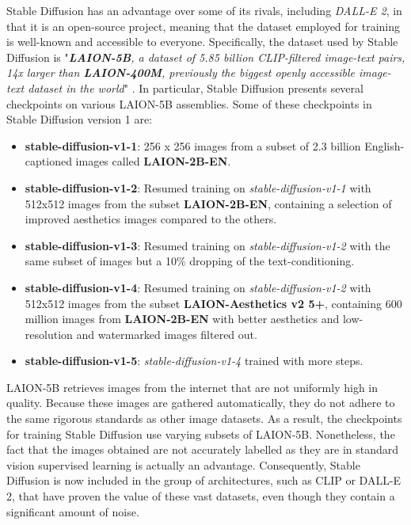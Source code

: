 Stable Diffusion has an advantage over some of its rivals, including \textit{DALL-E 2}, in that it is an open-source project, meaning that the dataset employed for training is well-known and accessible to everyone. Specifically, the dataset used by Stable Diffusion is "\textit{\textbf{LAION-5B}, a dataset of 5.85 billion CLIP-filtered image-text pairs, 14x larger than \textbf{LAION-400M}, previously the biggest openly accessible image-text dataset in the world}" \cite{schuhmann2022laion}. In particular, Stable Diffusion presents several checkpoints on various LAION-5B assemblies. Some of these checkpoints in Stable Diffusion version 1 \cite{SDCardHF} are:

\begin{itemize}
  \item \textbf{stable-diffusion-v1-1}: 256 x 256 images from a subset of 2.3 billion English-captioned images called \textbf{LAION-2B-EN}.
  \item \textbf{stable-diffusion-v1-2}: Resumed training on \textit{stable-diffusion-v1-1} with 512x512 images from the subset \textbf{LAION-2B-EN}, containing a selection of improved aesthetics images compared to the others.
  \item \textbf{stable-diffusion-v1-3}: Resumed training on \textit{stable-diffusion-v1-2} with the same subset of images but a 10\% dropping of the text-conditioning.
  \item \textbf{stable-diffusion-v1-4}: Resumed training on \textit{stable-diffusion-v1-2} with 512x512 images from the subset \textbf{LAION-Aesthetics v2 5+}, containing 600 million images from \textbf{LAION-2B-EN} with better aesthetics and low-resolution and watermarked images filtered out.
  \item \textbf{stable-diffusion-v1-5}: \textit{stable-diffusion-v1-4} trained with more steps.
\end{itemize}

LAION-5B retrieves images from the internet that are not uniformly high in quality. Because these images are gathered automatically, they do not adhere to the same rigorous standards as other image datasets. As a result, the checkpoints for training Stable Diffusion use varying subsets of LAION-5B. Nonetheless, the fact that the images obtained are not accurately labelled as they are in standard vision supervised learning is actually an advantage. Consequently, Stable Diffusion is now included in the group of architectures, such as CLIP or DALL-E 2, that have proven the value of these vast datasets, even though they contain a significant amount of noise.


